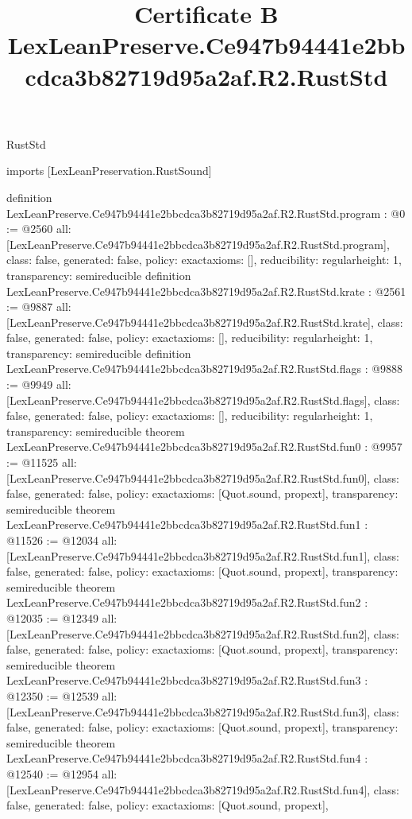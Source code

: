 \begin{lexlean}{RustStd}
\title{Certificate B LexLeanPreserve.Ce947b94441e2bbcdca3b82719d95a2af.R2.RustStd}
\begin{coremodule}
imports [LexLeanPreservation.RustSound]

definition LexLeanPreserve.Ce947b94441e2bbcdca3b82719d95a2af.R2.RustStd.program : @0 := @2560 {
  all: [LexLeanPreserve.Ce947b94441e2bbcdca3b82719d95a2af.R2.RustStd.program],
  class: false,
  generated: false,
  policy: exact{axioms: []},
  reducibility: regular{height: 1},
  transparency: semireducible
}
definition LexLeanPreserve.Ce947b94441e2bbcdca3b82719d95a2af.R2.RustStd.krate : @2561 := @9887 {
  all: [LexLeanPreserve.Ce947b94441e2bbcdca3b82719d95a2af.R2.RustStd.krate],
  class: false,
  generated: false,
  policy: exact{axioms: []},
  reducibility: regular{height: 1},
  transparency: semireducible
}
definition LexLeanPreserve.Ce947b94441e2bbcdca3b82719d95a2af.R2.RustStd.flags : @9888 := @9949 {
  all: [LexLeanPreserve.Ce947b94441e2bbcdca3b82719d95a2af.R2.RustStd.flags],
  class: false,
  generated: false,
  policy: exact{axioms: []},
  reducibility: regular{height: 1},
  transparency: semireducible
}
theorem LexLeanPreserve.Ce947b94441e2bbcdca3b82719d95a2af.R2.RustStd.fun0 : @9957 := @11525 {
  all: [LexLeanPreserve.Ce947b94441e2bbcdca3b82719d95a2af.R2.RustStd.fun0],
  class: false,
  generated: false,
  policy: exact{axioms: [Quot.sound, propext]},
  transparency: semireducible
}
theorem LexLeanPreserve.Ce947b94441e2bbcdca3b82719d95a2af.R2.RustStd.fun1 : @11526 := @12034 {
  all: [LexLeanPreserve.Ce947b94441e2bbcdca3b82719d95a2af.R2.RustStd.fun1],
  class: false,
  generated: false,
  policy: exact{axioms: [Quot.sound, propext]},
  transparency: semireducible
}
theorem LexLeanPreserve.Ce947b94441e2bbcdca3b82719d95a2af.R2.RustStd.fun2 : @12035 := @12349 {
  all: [LexLeanPreserve.Ce947b94441e2bbcdca3b82719d95a2af.R2.RustStd.fun2],
  class: false,
  generated: false,
  policy: exact{axioms: [Quot.sound, propext]},
  transparency: semireducible
}
theorem LexLeanPreserve.Ce947b94441e2bbcdca3b82719d95a2af.R2.RustStd.fun3 : @12350 := @12539 {
  all: [LexLeanPreserve.Ce947b94441e2bbcdca3b82719d95a2af.R2.RustStd.fun3],
  class: false,
  generated: false,
  policy: exact{axioms: [Quot.sound, propext]},
  transparency: semireducible
}
theorem LexLeanPreserve.Ce947b94441e2bbcdca3b82719d95a2af.R2.RustStd.fun4 : @12540 := @12954 {
  all: [LexLeanPreserve.Ce947b94441e2bbcdca3b82719d95a2af.R2.RustStd.fun4],
  class: false,
  generated: false,
  policy: exact{axioms: [Quot.sound, propext]},
}
\end{coremodule}
\end{lexlean}
